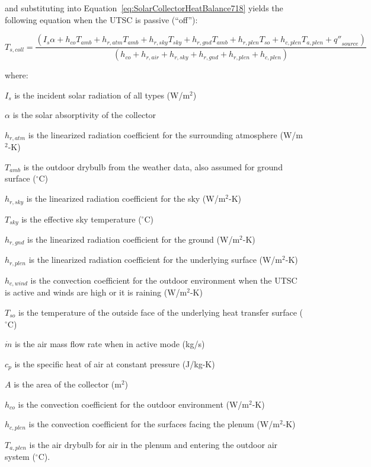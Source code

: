 and substituting into Equation~\ref{eq:SolarCollectorHeatBalance718} yields the following equation when the UTSC is passive (``off''):

\begin{equation}
{T_{s,coll}} = \frac{{\left( {{I_s}\alpha  + {h_{co}}{T_{amb}} + {h_{r,atm}}{T_{amb}} + {h_{r,sky}}{T_{sky}} + {h_{r,gnd}}{T_{amb}} + {h_{r,plen}}{T_{so}} + {h_{c,plen}}{T_{a,plen}} + {{q''}_{source}}} \right)}}{{\left( {{h_{co}} + {h_{r,air}} + {h_{r,sky}} + {h_{r,gnd}} + {h_{r,plen}} + {h_{c,plen}}} \right)}}
\end{equation}

where:

\({I_s}\) is the incident solar radiation of all types (W/m\(^{2}\))

\(\alpha\) is the solar absorptivity of the collector

\({h_{r,atm}}\) is the linearized radiation coefficient for the surrounding atmosphere (W/m\(^{2}\)-K)

\({T_{amb}}\) is the outdoor drybulb from the weather data, also assumed for ground surface (\(^{\circ}\)C)

\({h_{r,sky}}\) is the linearized radiation coefficient for the sky (W/m\(^{2}\)-K)

\({T_{sky}}\) is the effective sky temperature (\(^{\circ}\)C)

\({h_{r,gnd}}\) is the linearized radiation coefficient for the ground (W/m\(^{2}\)-K)

\({h_{r,plen}}\) is the linearized radiation coefficient for the underlying surface (W/m\(^{2}\)-K)

\({h_{c,wind}}\) is the convection coefficient for the outdoor environment when the UTSC is active and winds are high or it is raining (W/m\(^{2}\)-K)

\({T_{so}}\) is the temperature of the outside face of the underlying heat transfer surface (\(^{\circ}\)C)

\(\dot m\) is the air mass flow rate when in active mode (kg/s)

\({c_p}\) is the specific heat of air at constant pressure (J/kg-K)

\(A\) is the area of the collector (m\(^{2}\))

\({h_{co}}\) is the convection coefficient for the outdoor environment (W/m\(^{2}\)-K)

\({h_{c,plen}}\) is the convection coefficient for the surfaces facing the plenum (W/m\(^{2}\)-K)

\({T_{a,plen}}\) is the air drybulb for air in the plenum and entering the outdoor air system (\(^{\circ}\)C).

